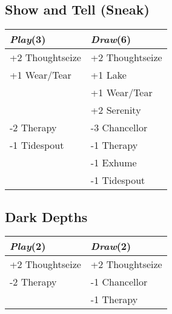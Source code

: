 \documentclass{article}
\renewcommand *\contentsname{Contents}
\begin{document}
\begin{multicols}{2}
\subsection*{Show and Tell (Sneak)}
\begin{center}
\begin{tabular}{| l | l |}
\hline
\textit{Play}(3) & \textit{Draw}(6) \\
\hline
\cellcolor[HTML]{BBDDBB}\small{+2 Thoughtseize} & \cellcolor[HTML]{BBDDBB}\small{+2 Thoughtseize}\\
\cellcolor[HTML]{BBDDBB}\small{+1 Wear/Tear} & \cellcolor[HTML]{BBDDBB}\small{+1 Lake}\\
 & \cellcolor[HTML]{BBDDBB}\small{+1 Wear/Tear}\\
 & \cellcolor[HTML]{BBDDBB}\small{+2 Serenity}\\
\cellcolor[HTML]{DDBBBB}\small{-2 Therapy} & \cellcolor[HTML]{DDBBBB}\small{-3 Chancellor}\\
\cellcolor[HTML]{DDBBBB}\small{-1 Tidespout} & \cellcolor[HTML]{DDBBBB}\small{-1 Therapy}\\
 & \cellcolor[HTML]{DDBBBB}\small{-1 Exhume}\\
 & \cellcolor[HTML]{DDBBBB}\small{-1 Tidespout}\\
\hline
\end{tabular}
\end{center}
\subsection*{Dark Depths}
\begin{center}
\begin{tabular}{| l | l |}
\hline
\textit{Play}(2) & \textit{Draw}(2) \\
\hline
\cellcolor[HTML]{BBDDBB}\small{+2 Thoughtseize} & \cellcolor[HTML]{BBDDBB}\small{+2 Thoughtseize}\\
\cellcolor[HTML]{DDBBBB}\small{-2 Therapy} & \cellcolor[HTML]{DDBBBB}\small{-1 Chancellor}\\
 & \cellcolor[HTML]{DDBBBB}\small{-1 Therapy}\\
\hline
\end{tabular}
\end{center}

\end{multicols}
\end{document}
